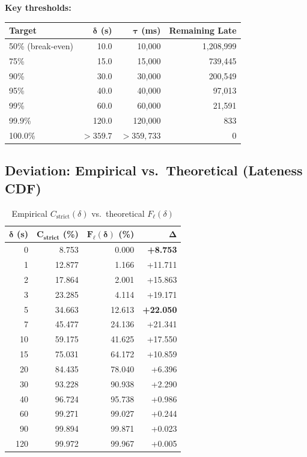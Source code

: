 \documentclass[11pt,a4paper]{article}
\begin{document}
\textbf{Key thresholds:}
\begin{center}
\begin{tabular}{lrrr}
\toprule
\textbf{Target} & $\bm{\delta}$ \textbf{(s)} & $\bm{\tau}$ \textbf{(ms)} & \textbf{Remaining Late} \\
\midrule
50\% (break-even) & 10.0   & 10,000   & 1,208,999 \\
75\%              & 15.0   & 15,000   & 739,445 \\
90\%              & 30.0   & 30,000   & 200,549 \\
95\%              & 40.0   & 40,000   & 97,013 \\
99\%              & 60.0   & 60,000   & 21,591 \\
99.9\%            & 120.0  & 120,000  & 833 \\
100.0\%           & ${>}359.7$ & ${>}359{,}733$ & 0 \\
\bottomrule
\end{tabular}
\end{center}

\subsection{Deviation: Empirical vs.\ Theoretical (Lateness CDF)}
\label{sec:deviation}

\begin{table}[H]
\centering
\caption{Empirical $C_{\text{strict}}(\delta)$ vs.\ theoretical $F_\ell(\delta)$}
\label{tab:deviation}
\begin{tabular}{rrrr}
\toprule
$\bm{\delta}$ \textbf{(s)} & $\mathbf{C_{\textbf{strict}}}$ \textbf{(\%)} & $\mathbf{F_\ell(\delta)}$ \textbf{(\%)} & $\mathbf{\Delta}$ \\
\midrule
0   & 8.753  & 0.000   & \textbf{+8.753} \\
1   & 12.877 & 1.166   & +11.711 \\
2   & 17.864 & 2.001   & +15.863 \\
3   & 23.285 & 4.114   & +19.171 \\
5   & 34.663 & 12.613  & \textbf{+22.050} \\
7   & 45.477 & 24.136  & +21.341 \\
10  & 59.175 & 41.625  & +17.550 \\
15  & 75.031 & 64.172  & +10.859 \\
20  & 84.435 & 78.040  & +6.396 \\
30  & 93.228 & 90.938  & +2.290 \\
40  & 96.724 & 95.738  & +0.986 \\
60  & 99.271 & 99.027  & +0.244 \\
90  & 99.894 & 99.871  & +0.023 \\
120 & 99.972 & 99.967  & +0.005 \\
\bottomrule
\end{tabular}
\end{table}
\end{document}
